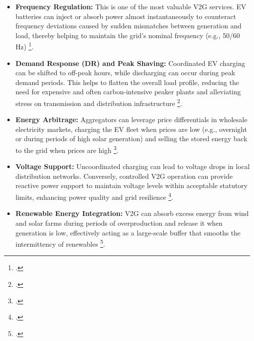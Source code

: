 \begin{itemize}
    \item \textbf{Frequency Regulation:} This is one of the most valuable V2G services. EV batteries can inject or absorb power almost instantaneously to counteract frequency deviations caused by sudden mismatches between generation and load, thereby helping to maintain the grid's nominal frequency (e.g., 50/60 Hz) \footcite{alfaverh2022optima}.
    \item \textbf{Demand Response (DR) and Peak Shaving:} Coordinated EV charging can be shifted to off-peak hours, while discharging can occur during peak demand periods. This helps to flatten the overall load profile, reducing the need for expensive and often carbon-intensive peaker plants and alleviating stress on transmission and distribution infrastructure \footcite{orfanoudakis2022deep, van2011peak}.
    \item \textbf{Energy Arbitrage:} Aggregators can leverage price differentials in wholesale electricity markets, charging the EV fleet when prices are low (e.g., overnight or during periods of high solar generation) and selling the stored energy back to the grid when prices are high \footcite{alfaverh2022optima}.
    \item \textbf{Voltage Support:} Uncoordinated charging can lead to voltage drops in local distribution networks. Conversely, controlled V2G operation can provide reactive power support to maintain voltage levels within acceptable statutory limits, enhancing power quality and grid resilience \footcite{wang2023deep}.
    \item \textbf{Renewable Energy Integration:} V2G can absorb excess energy from wind and solar farms during periods of overproduction and release it when generation is low, effectively acting as a large-scale buffer that smooths the intermittency of renewables \footcite{khan2024review}.
\end{itemize}

